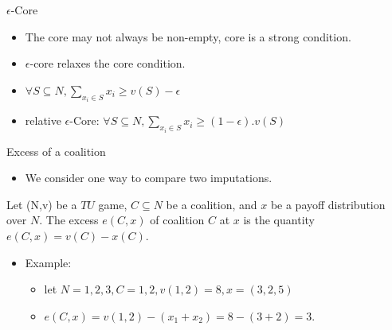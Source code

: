 \documentclass{beamer}
\begin{document}
\begin{frame}{$\epsilon$-Core}
    \begin{itemize}
        \item The core may not always be non-empty, core is a strong condition.
        \item $\epsilon$-core relaxes the core condition.
        \item $\forall S \subseteq N, \sum_{x_i \in S} x_i \geq v(S) - \epsilon$
        \item relative $\epsilon$-Core: $\forall S \subseteq N, \sum_{x_i \in S} x_i \geq (1-\epsilon).v(S)$
    \end{itemize}
\end{frame}

\begin{frame}{Excess of a coalition}
    \begin{itemize}
        \item We consider one way to compare two imputations.
    \end{itemize}

    \begin{definition} \label{dfn:marginalcontribution}
        Let (N,v) be a $TU$ game, $C \subseteq N$ be a coalition, and $x$ be a payoff distribution over $N$. The excess $e(C,x)$ of coalition $C$ at $x$ is the quantity $e(C,x) = v(C) - x(C)$.
    \end{definition}

    \begin{itemize}
        \item Example:
        \begin{itemize}
            \item let $N={1,2,3}, C={1,2}, v({1,2})=8, x=(3,2,5)$
            \item $e(C,x)=v({1,2})-(x_1 + x_2)=8-(3+2)=3.$
        \end{itemize}
    \end{itemize}

\end{frame}
\end{document}
